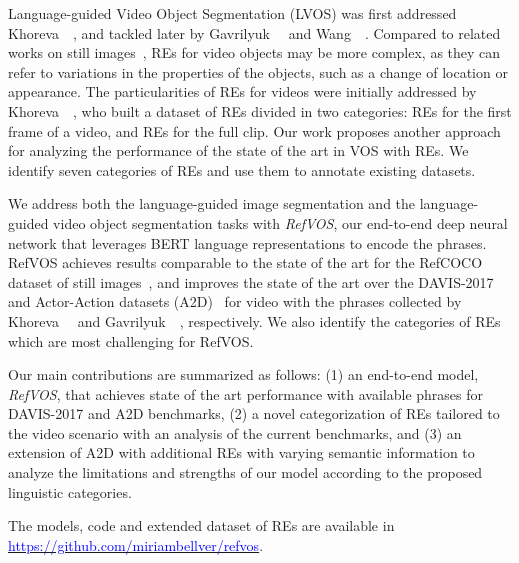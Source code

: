 \documentclass[10pt,twocolumn,letterpaper]{article}
\begin{document}
Language-guided Video Object Segmentation (LVOS) was first addressed Khoreva~\etal~\cite{khoreva2018video}, and tackled later by Gavrilyuk~\etal~\cite{gavrilyuk2018actor} and Wang~\etal~\cite{wang2019asymmetric}. 
Compared to related works on still images~\cite{yu2018mattnet,chen2019see}, REs for video objects may be more complex, as they can refer to variations in the properties of the objects, such as a change of location or appearance.
The particularities of REs for videos were initially addressed by Khoreva~\etal~\cite{khoreva2018video}, who built a dataset of REs divided in two categories: REs for the first frame of a video, and REs for the full clip.
Our work proposes another approach for analyzing the performance of the state of the art in VOS with REs. We identify seven categories of REs and use them to annotate existing datasets.







We address both the language-guided image segmentation and the language-guided video object segmentation tasks with \textit{RefVOS}, 
our end-to-end deep neural network that 
leverages BERT language representations \cite{devlin2019bert} to encode the phrases.
RefVOS achieves results comparable to the state of the art for the RefCOCO dataset of still images~\cite{kazemzadeh2014referitgame}, and improves the state of the art over the DAVIS-2017~\cite{pont20172017} and Actor-Action datasets (A2D)~\cite{xu2015can} for video with the phrases collected by Khoreva~\etal~\cite{khoreva2018video} and Gavrilyuk~\etal~\cite{gavrilyuk2018actor}, respectively.
We also identify the categories of REs which are most challenging for RefVOS.



Our main contributions are summarized as follows: (1) an end-to-end model, \textit{RefVOS}, that achieves state of the art performance with available phrases for DAVIS-2017 and A2D benchmarks, (2) a novel categorization of REs tailored to the video scenario with an analysis of the current benchmarks, and (3) an extension of A2D with additional REs with varying semantic information to analyze the limitations and strengths of our model according to the proposed linguistic categories.


The models, code and extended dataset of REs are available in \href{https://github.com/miriambellver/refvos}{\textcolor{blue}{https://github.com/miriambellver/refvos}}.
\end{document}
